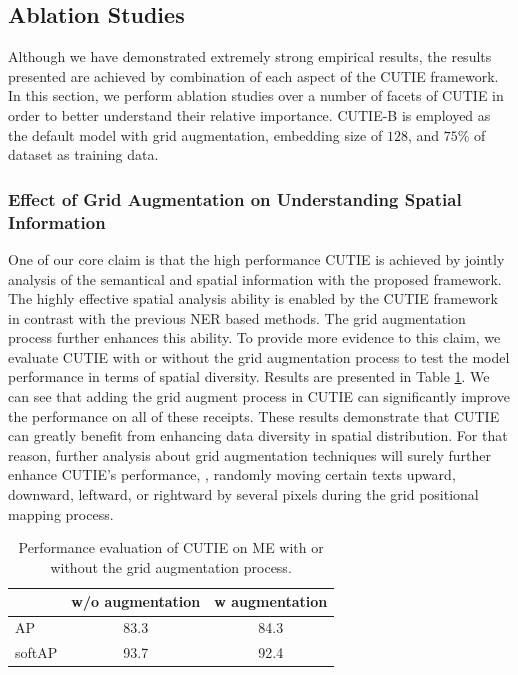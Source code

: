 \documentclass[10pt,twocolumn,letterpaper]{article}
\begin{document}
\subsection{Ablation Studies}
Although we have demonstrated extremely strong empirical results, the results presented are achieved by combination of each aspect of the CUTIE framework. In this section, we perform ablation studies over a number of facets of CUTIE in order to better understand their relative importance. CUTIE-B is employed as the default model with grid augmentation, embedding size of $128$, and $75\%$ of dataset as training data.

\subsubsection{Effect of Grid Augmentation on Understanding Spatial Information}
One of our core claim is that the high performance CUTIE is achieved by jointly analysis of the semantical and spatial information with the proposed framework. The highly effective spatial analysis ability is enabled by the CUTIE framework in contrast with the previous NER based methods. The grid augmentation process further enhances this ability. To provide more evidence to this claim, we evaluate CUTIE with or without the grid augmentation process to test the model performance in terms of spatial diversity. Results are presented in Table \ref{tab:augmentation}. We can see that adding the grid augment process in CUTIE can significantly improve the performance on all of these receipts. These results demonstrate that CUTIE can greatly benefit from enhancing data diversity in spatial distribution. For that reason, further analysis about grid augmentation techniques will surely further enhance CUTIE's performance, \eg, randomly moving certain texts upward, downward, leftward, or rightward by several pixels during the grid positional mapping process. 
\begin{table}
	\caption{Performance evaluation of CUTIE on ME with or without the grid augmentation process.}
\begin{center}
\begin{tabular}{l | c | c}
	 & w/o augmentation & w augmentation \\
	\hline
	AP & 83.3 & 84.3 \\
	softAP & 93.7 & 92.4 \\
\end{tabular}
\end{center}
	\label{tab:augmentation}
\end{table}
\end{document}
